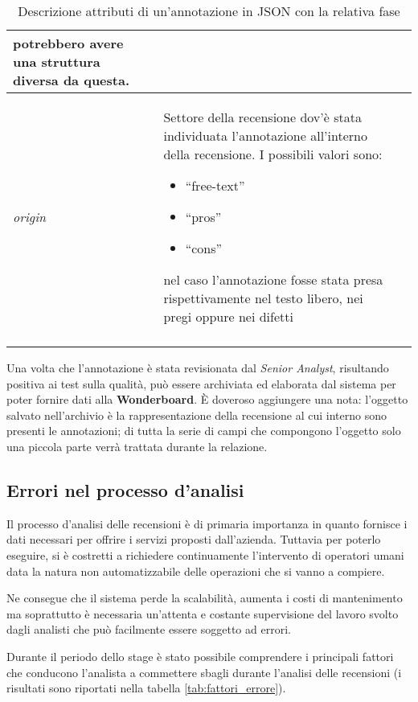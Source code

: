 \begin{center}
\begin{longtable}{|>{\centering}p{2.2cm}|p{8cm}|>{\centering}p{2.5cm}|}
potrebbero avere una struttura diversa da questa. &
\nameref{salvarla} \tabularnewline\hline
\textit{origin} &
Settore della recensione dov'è stata individuata l'annotazione all'interno della
recensione. I possibili valori sono:
\begin{itemize}
\item ``free-text''
\item ``pros''
\item ``cons''
\end{itemize}
nel caso l'annotazione fosse stata presa rispettivamente nel testo libero, nei
pregi oppure nei difetti &
\nameref{evidenziarla} \tabularnewline \hline
\caption{Descrizione attributi di un'annotazione in JSON con la relativa fase}
\label{tab:attributi_annotazione}
\end{longtable}
\end{center}

Una volta che l'annotazione è stata revisionata dal \textit{Senior Analyst},
risultando positiva ai test sulla qualità, può essere archiviata ed elaborata
dal sistema per poter fornire dati alla \textbf{Wonderboard}. È doveroso
aggiungere una nota: l'oggetto salvato nell'archivio è la rappresentazione
della recensione al cui interno sono presenti le annotazioni; di tutta la serie
di campi che compongono l'oggetto solo una piccola parte verrà trattata durante
la relazione.

\subsection{Errori nel processo d'analisi}
Il processo d'analisi delle recensioni è di primaria importanza in quanto
fornisce i dati necessari per offrire i servizi proposti dall'azienda.
Tuttavia per poterlo eseguire, si è costretti a richiedere continuamente
l'intervento di operatori umani data la natura non automatizzabile delle
operazioni che si vanno a compiere.

Ne consegue che il sistema perde la scalabilità, aumenta i costi di mantenimento
ma soprattutto è necessaria un'attenta e costante supervisione del lavoro svolto
dagli analisti che può facilmente essere soggetto ad errori.

Durante il periodo dello stage è stato possibile comprendere i principali
fattori che conducono l'analista a commettere sbagli durante l'analisi delle
recensioni (i risultati sono riportati nella tabella \ref{tab:fattori_errore}).

